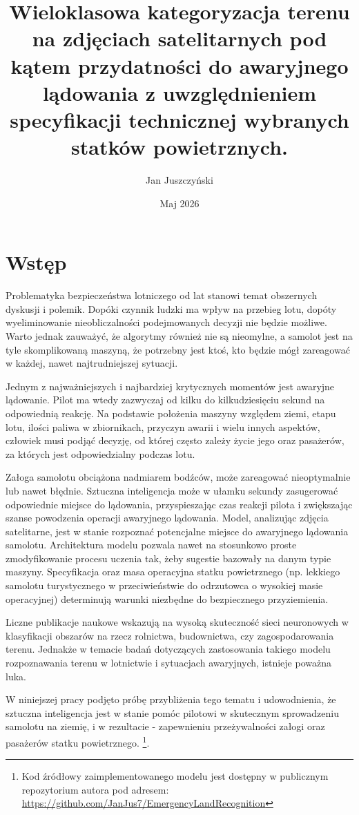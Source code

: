 \documentclass[12pt, a4paper]{report}
\title{Wieloklasowa kategoryzacja terenu na zdjęciach satelitarnych pod kątem przydatności do awaryjnego lądowania z uwzględnieniem specyfikacji technicznej wybranych statków powietrznych.}
\author{Jan Juszczyński}
\date{Maj 2026}
\begin{document}
\maketitle

\tableofcontents


\chapter{Wstęp}
\par Problematyka bezpieczeństwa lotniczego od lat stanowi temat obszernych dyskusji i polemik. Dopóki czynnik ludzki ma wpływ na przebieg lotu, dopóty wyeliminowanie nieobliczalności podejmowanych decyzji nie będzie możliwe. Warto jednak zauważyć, że algorytmy również nie są nieomylne, a samolot jest na tyle skomplikowaną maszyną, że potrzebny jest ktoś, kto będzie mógł zareagować w każdej, nawet najtrudniejszej sytuacji. 
\par Jednym z najważniejszych i najbardziej krytycznych momentów jest awaryjne lądowanie. Pilot ma wtedy zazwyczaj od kilku do kilkudziesięciu sekund na odpowiednią reakcję. Na podstawie położenia maszyny względem ziemi, etapu lotu, ilości paliwa w zbiornikach, przyczyn awarii i wielu innych aspektów, człowiek musi podjąć decyzję, od której często zależy życie jego oraz pasażerów, za których jest odpowiedzialny podczas lotu. 
\par Załoga samolotu obciążona nadmiarem bodźców, może zareagować nieoptymalnie lub nawet błędnie. Sztuczna inteligencja może w ułamku sekundy zasugerować odpowiednie miejsce do lądowania, przyspieszając czas reakcji pilota i zwiększając szanse powodzenia operacji awaryjnego lądowania. Model, analizując zdjęcia satelitarne, jest w stanie rozpoznać potencjalne miejsce do awaryjnego lądowania samolotu. Architektura modelu pozwala nawet na stosunkowo proste zmodyfikowanie procesu uczenia tak, żeby sugestie bazowały na danym typie maszyny. Specyfikacja oraz masa operacyjna statku powietrznego (np. lekkiego samolotu turystycznego w przeciwieństwie do odrzutowca o wysokiej masie operacyjnej) determinują warunki niezbędne do bezpiecznego przyziemienia.
\par Liczne publikacje naukowe wskazują na wysoką skuteczność sieci neuronowych w klasyfikacji obszarów na rzecz rolnictwa, budownictwa, czy zagospodarowania terenu. Jednakże w temacie badań dotyczących zastosowania takiego modelu rozpoznawania terenu w lotnictwie i sytuacjach awaryjnych, istnieje poważna luka. 
\par W niniejszej pracy podjęto próbę przybliżenia tego tematu i udowodnienia, że sztuczna inteligencja jest w stanie pomóc pilotowi w skutecznym sprowadzeniu samolotu na ziemię, i w rezultacie - zapewnieniu przeżywalności załogi oraz pasażerów statku powietrznego. \footnote{Kod źródłowy zaimplementowanego modelu jest dostępny w publicznym repozytorium autora pod adresem: \url{https://github.com/JanJus7/EmergencyLandRecognition}}.
\end{document}
